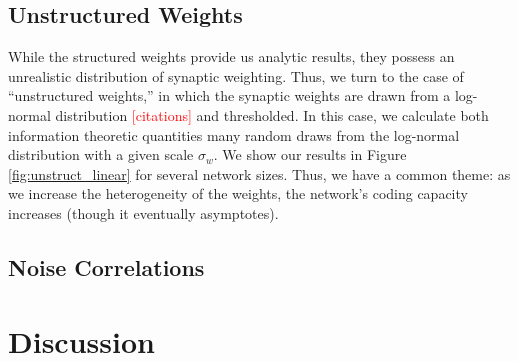 \documentclass[11pt]{article}
\begin{document}
	\subsection{Unstructured Weights}
	While the structured weights provide us analytic results, they possess an unrealistic distribution of synaptic weighting. Thus, we turn to the case of ``unstructured weights,'' in which the synaptic weights are drawn from a log-normal distribution \textcolor{red}{[citations]} and thresholded. In this case, we calculate both information theoretic quantities many random draws from the log-normal distribution with a given scale $\sigma_w$.  We show our results in Figure \ref{fig:unstruct_linear} for several network sizes. Thus, we have a common theme: as we increase the heterogeneity of the weights, the network's coding capacity increases (though it eventually asymptotes). 
	


	
	\subsection{Noise Correlations}
	

	\newpage
	\section{Discussion}
	\appendix
	\newpage
\end{document}
